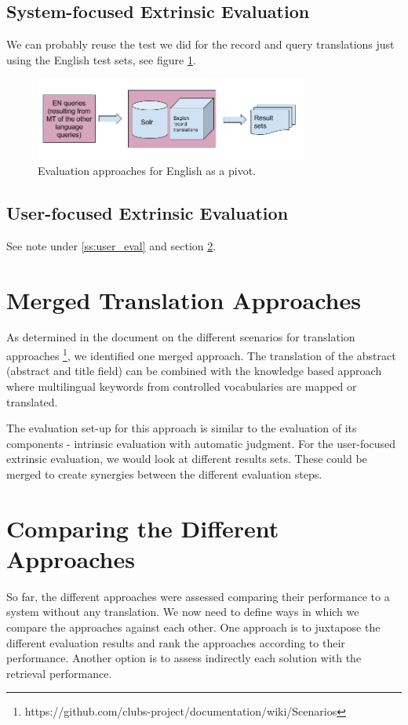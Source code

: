 \documentclass[a4paper,11pt]{article}
\begin{document}
\subsection{System-focused Extrinsic Evaluation}
We can probably reuse the test we did for the record and query translations just using the English test sets, see figure \ref{figpivot}. 


\begin{figure}
	\centering
  \includegraphics[width=0.8\textwidth]{./img/pivot_approach.png}
	\caption{Evaluation approaches for English as a pivot.}
	\label{figpivot}
\end{figure}

\subsection{User-focused Extrinsic Evaluation}

See note under \ref{ss:user_eval} and section \ref{secCom}.

\section{Merged Translation Approaches}
As determined in the document on the different scenarios for translation approaches \footnote{https://github.com/clubs-project/documentation/wiki/Scenarios}, we identified one merged approach. The translation of the abstract (abstract and title field) can be combined with the knowledge based approach where multilingual keywords from controlled vocabularies are mapped or translated. 

The evaluation set-up for this approach is similar to the evaluation of its components - intrinsic evaluation with automatic judgment. For the user-focused extrinsic evaluation, we would look at different results sets. These could be merged to create synergies between the different evaluation steps.

\section{Comparing the Different Approaches}\label{secCom}
So far, the different approaches were assessed comparing their performance to a system without any translation. We now need to define ways in which we compare the approaches against each other.
One approach is to juxtapose the different evaluation results and rank the approaches according to their performance. Another option is to assess indirectly each solution with the retrieval performance. 
\end{document}
